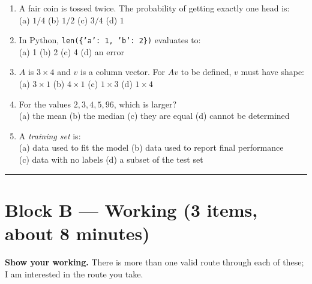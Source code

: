 \documentclass[11pt]{article}
\begin{document}
\begin{enumerate}[label=A\arabic*.,leftmargin=*]
  \item A fair coin is tossed twice. The probability of getting exactly one head is:\\
    \hspace*{1em}(a) $1/4$ \qquad (b) $1/2$ \qquad (c) $3/4$ \qquad (d) $1$
  \item In Python, \texttt{len(\{'a': 1, 'b': 2\})} evaluates to:\\
    \hspace*{1em}(a) 1 \qquad (b) 2 \qquad (c) 4 \qquad (d) an error
  \item $A$ is $3 \times 4$ and $v$ is a column vector. For $Av$ to be defined, $v$ must have shape:\\
    \hspace*{1em}(a) $3 \times 1$ \qquad (b) $4 \times 1$ \qquad (c) $1 \times 3$ \qquad (d) $1 \times 4$
  \item For the values $2, 3, 4, 5, 96$, which is larger?\\
    \hspace*{1em}(a) the mean \qquad (b) the median \qquad (c) they are equal \qquad (d) cannot be determined
  \item A \emph{training set} is:\\
    \hspace*{1em}(a) data used to fit the model \qquad (b) data used to report final performance \\
    \hspace*{1em}(c) data with no labels \qquad (d) a subset of the test set
\end{enumerate}

\bigskip\hrule\bigskip

\section*{Block B --- Working \hfill \normalfont\small(3 items, about 8 minutes)}
\textbf{Show your working.} There is more than one valid route through each of these; I am interested
in the route you take.
\end{document}
